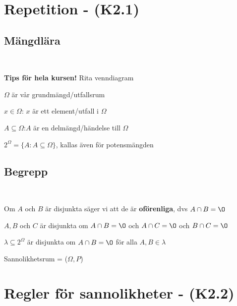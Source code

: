 \section{Repetition - (K2.1)}
\subsection{Mängdlära}\hfill\\
\par
\noindent \textbf{Tips för hela kursen!} Rita venndiagram\par
$\Omega$ är vår grundmängd/utfallsrum\par
\noindent $x\in\Omega$: $x$ är ett element/utfall i $\Omega$\par
\noindent $A\subseteq\Omega$:$A$ är en delmängd/händelse till $\Omega$\par
\noindent $2^{\Omega} = \{A:A\subseteq\Omega\}$, kallas även för potensmängden
\par\bigskip
\subsection{Begrepp}\hfill\\
\par
\noindent Om $A$ och $B$ är disjunkta säger vi att de är \textbf{oförenliga}, dvs $A\cap B = \O$\par\par
\noindent $A,B$ och $C$ är disjunkta om $A\cap B = \O$ och $A\cap C = \O$ och $B\cap C=\O$\par
\noindent $\lambda\subseteq 2^{\Omega}$ är disjunkta om $A\cap B = \O$ för alla $A,B\in\lambda$\par
\noindent Sannolikhetsrum = ($\Omega, P$)
\par\bigskip
\section{Regler för sannolikheter - (K2.2)}
\par\bigskip
